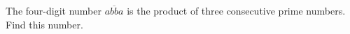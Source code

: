 The four-digit number $\overline{abba}$ is the product of three consecutive prime numbers. Find this number.
